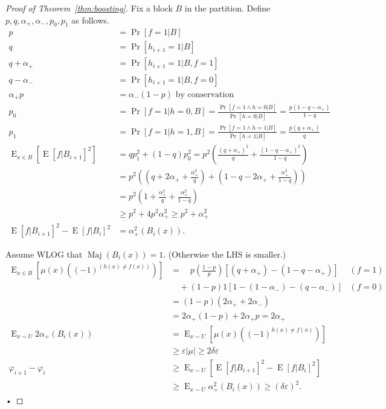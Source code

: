 \begin{proof}[Proof of Theorem~\ref{thm:boosting}]
Fix a block $B$ in the partition. Define $p,q,\alpha_+,\alpha_-,p_0,p_1$ as follows. 
\begin{align}
p&=\Pr[f=1|B]\\
q&=\Pr[h_{i+1} = 1|B]\\ %
q+\alpha_+ &= \Pr[h_{i+1}=1|B, f=1]\\ %
q-\alpha_- &= \Pr[h_{i+1}=1|B, f=0]\\ %
\alpha_+p &= \alpha_-(1-p) \text{ by conservation}\\
p_0&= \Pr[f=1|h=0,B] = \frac{\Pr[f=1\wedge h=0|B]}{\Pr[h=0|B]} = \frac{p(1-q-\alpha_+)}{1-q}\\
p_1&= \Pr[f=1|h=1,B] = \frac{\Pr[f=1\wedge h=1|B]}{\Pr[h=1|B]} = \frac{p(q+\alpha_+)}{q}\\
\operatorname{E}_{x\in B} [\operatorname{E}[f|B_{i+1}]^2]&=qp_1^2 + (1-q)p_0^2 = p^2 \left(\frac{(q+\alpha_+)^2}{q} + \frac{(1-q-\alpha_+)^2}{1-q}\right) \\
&=p^2\left(
\left(q+2\alpha_+ + \frac{\alpha_+^2}{q}\right)
+
\left(1-q-2\alpha_+ + \frac{\alpha_+^2}{1-q}\right)\right)
\\
&=p^2\left(1+\frac{\alpha_+^2}{q} + \frac{\alpha_+^2}{1-q}\right)\\
&\ge p^2 + 4p^2 \alpha_+^2 \ge
p^2+
 \alpha_+^2\\
\operatorname{E}[f|B_{i+1}]^2 - \operatorname{E}[f|B_i]^2%
&=\alpha_+^2(B_i(x)).
\end{align}


Assume WLOG that $\operatorname{Maj}(B_i(x))=1$.  (Otherwise the LHS is smaller.)
\begin{align}
\operatorname{E}_{x\in B}[\mu(x) ((-1)^{(h(x)\ne f(x))})]
&=\quad p\left(\frac{1-p}{p}\right) \left[(q+\alpha_+) - (1-q-\alpha_+)\right]&(f=1)\\
&\quad +(1-p) 1 [1-(1-\alpha_-) - (q-\alpha_-)]&(f=0)\\
&=(1-p) (2\alpha_++2\alpha_-)\\
&= 2\alpha_+(1-p) + 2\alpha_+p=2\alpha_+\\
\operatorname{E}_{x\sim U} 2\alpha_+(B_i(x)) 
&=\operatorname{E}_{x\sim U} [\mu(x) ((-1)^{h(x)\ne f(x)})]\\
&\ge \varepsilon|\mu| \ge 2\delta \varepsilon\\
\varphi_{i+1}-\varphi_i &\ge 
\operatorname{E}_{x\sim U} [\operatorname{E}[f|B_{i+1}]^2 - \operatorname{E}[f|B_i]^2]\\
&\ge 
\operatorname{E}_{x\sim U} \alpha_+^2(B_i(x))\ge  (\delta\varepsilon)^2.
\end{align}•


\end{proof}
